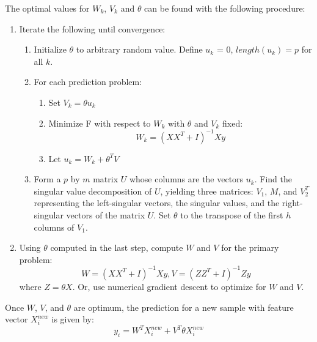 \documentclass{article}
\begin{document}
\par
The optimal values for $W_k$, $V_k$ and $\theta$ can be found with the following procedure:
\begin{enumerate}
	\item Iterate the following until convergence:
	\begin{enumerate}
		\item Initialize $\theta$ to arbitrary random value. Define $u_k$ = 0, $length(u_k) = p$ for all $k$.
		\item For each prediction problem:
		\begin{enumerate}
			\item Set $V_k = \theta u_k$
			\item Minimize F with respect to $W_k$ with $\theta$ and $V_k$ fixed:
			\begin{equation} W_k = (XX^T + I)^{-1}Xy \end{equation}
			\item Let $u_k = W_k + \theta ^T V$
		\end{enumerate}
		\item Form a $p$ by $m$ matrix $U$ whose columns are the vectors $u_k$. Find
		the singular value decomposition of $U$, yielding three matrices: $V_1$, $M$,
		and $V_2^T$ representing the left-singular vectors, the singular values, and the
		right-singular vectors of the matrix $U$. Set $\theta$ to the transpose of the
		first $h$ columns of $V_1$.
	\end{enumerate}
	\item Using $\theta$ computed in the last step, compute $W$ and $V$ for the primary
	problem: \begin{equation} W = (XX^T + I)^{-1}Xy, V = (ZZ^T + I)^{-1} Zy \end{equation}
	where $Z = \theta X$. Or, use numerical gradient descent to optimize for $W$ and
	$V$.
\end{enumerate}
Once $W$, $V$, and $\theta$ are optimum, the prediction for a new sample with feature vector
$X^{new}_i$ is given by:
\begin{equation} y_i = W^TX^{new}_i + V^T\theta X^{new}_i \end{equation}
\end{document}
